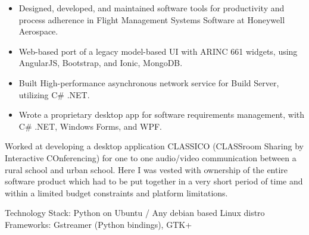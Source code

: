 \documentclass[10pt,a4paper,ragged2e,withhyper]{altacv}
\begin{document}
\begin{paracol}{2}
\begin{itemize}
  \item Designed, developed, and maintained software tools for productivity and process adherence in Flight Management Systems Software at Honeywell Aerospace.
  \item Web-based port of a legacy model-based UI with ARINC 661 widgets, using AngularJS, Bootstrap, and Ionic, MongoDB.
  \item Built High-performance asynchronous network service for Build Server, utilizing C\# .NET.
  \item Wrote a proprietary desktop app for software requirements management, with C\# .NET, Windows Forms, and WPF.
\end{itemize}

\divider

Worked at developing a desktop application CLASSICO (CLASSroom Sharing by Interactive COnferencing) for one to one audio/video communication between a rural school and urban school. Here I was vested with ownership of the entire software product which had to be put together in a very short period of time and within a limited budget constraints and platform limitations. 

Technology Stack: Python on Ubuntu / Any debian based Linux distro
Frameworks: Gstreamer (Python bindings), GTK+






\end{paracol}
\end{document}
